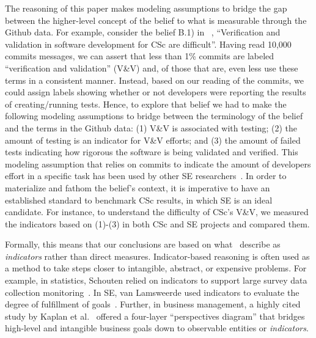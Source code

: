 \documentclass[conference,10pt]{IEEEtran}
\begin{document}
The reasoning of this 
paper makes
modeling assumptions to bridge the gap between the higher-level concept of the belief to what is measurable through the Github data. For example, consider the belief B.1)  in ~, ``Verification and validation in software development for CSc are difficult''.  
Having read 10,000 commits messages, we can assert that 
less than 1\% commits are labeled  ``verification and validation'' (V\&V) and, of those that are,
even less use these terms in a consistent manner. Instead, based on our reading of the commits, we could assign labels showing whether or not developers were reporting the results of creating/running tests. Hence, to explore that belief we had to make the following modeling assumptions to bridge between the terminology of the belief and the terms in the Github data: (1) V\&V is associated with testing; (2) the amount of testing is an indicator for V\&V efforts; and (3) the amount of failed tests indicating how rigorous the software is being validated and verified. This modeling assumption that relies on commits to indicate the amount of developers effort in a specific task has been used by other SE researchers~\cite{vasilescu16_limit, xia2019sequential}. In order to materialize and fathom the belief's context, it is imperative to have an established standard to benchmark CSc results, in which SE is an ideal candidate. For instance, to understand the difficulty of CSc's V\&V, we measured the indicators based on (1)-(3) in both CSc and SE projects and compared them.

Formally, this means that our conclusions are based on what~\citet{schouten2010indicators} describe as
 {\em indicators} rather than direct measures. Indicator-based reasoning is often used as a method to take steps closer to intangible, abstract, or expensive problems. For example,
 in statistics, Schouten relied on indicators to support large survey data collection monitoring~\cite{schouten2010indicators}. In SE, van Lamsweerde used indicators to evaluate the degree of fulfillment of goals~\cite{vanLamsweerde2009_requirement}.
 Further, in business 
 management, a highly cited study by Kaplan et al.~\cite{kaplan1996using} offered a four-layer ``perspectives diagram'' that bridges high-level and intangible business goals down
 to observable entities or \textit{indicators}.
\end{document}
